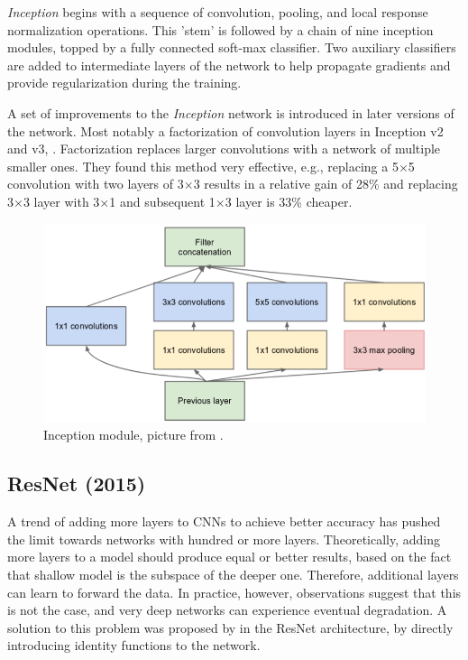 \textit{Inception} begins with a sequence of convolution, pooling, and local response normalization operations. This 'stem' is followed by a chain of nine inception modules, topped by a fully connected soft-max classifier. Two auxiliary classifiers are added to intermediate layers of the network to help propagate gradients and provide regularization during the training.

A set of improvements to the \textit{Inception} network is introduced in later versions of the network. Most notably a factorization of convolution layers in Inception v2 and v3, \citeauthor{bib:inception2} \cite{bib:inception2}. Factorization replaces larger convolutions with a network of multiple smaller ones. They found this method very effective, e.g., replacing a 5$\times$5 convolution with two layers of 3$\times$3 results in a relative gain of 28\% and replacing 3$\times$3 layer with 3$\times$1 and subsequent 1$\times$3 layer is 33\% cheaper.

\begin{figure}
    \includegraphics[width=\textwidth]{img/inception}
    \caption{Inception module, picture from \cite[figure 2]{bib:googlenet}.}
    \label{fig:incept_mod}
\end{figure}

\subsection{ResNet (2015)}
\label{sec:resnet}
A trend of adding more layers to CNNs to achieve better accuracy has pushed the limit towards networks with hundred or more layers.  Theoretically, adding more layers to a model should produce equal or better results, based on the fact that shallow model is the subspace of the deeper one. Therefore, additional layers can learn to forward the data. In practice, however, observations suggest that this is not the case, and very deep networks can experience eventual degradation. A solution to this problem was proposed by \citeauthor{bib:resnet} \cite{bib:resnet} in the ResNet architecture, by directly introducing identity functions to the network.

